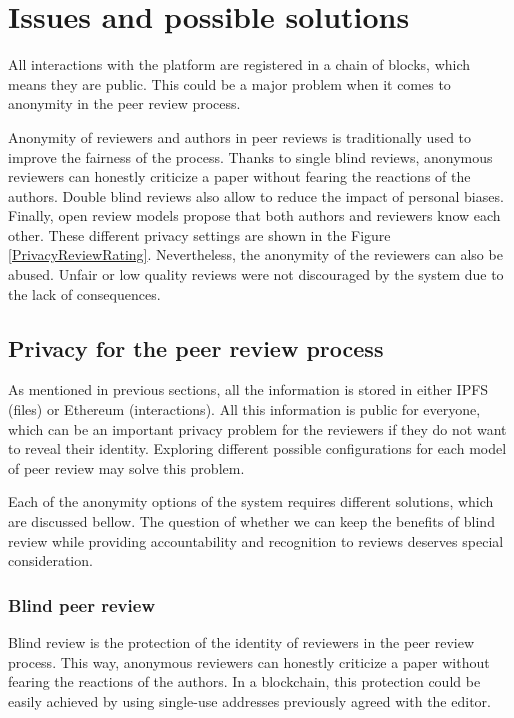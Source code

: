 \section{Issues and possible solutions}
\label{sec:privacyReview}


All interactions with the platform are registered in a chain of blocks, which
means they are public. This could be a major problem when it comes to anonymity
in the peer review process.

Anonymity of reviewers and authors in peer reviews is traditionally used to
improve the fairness of the process. Thanks to single blind reviews, anonymous
reviewers can honestly criticize a paper without fearing the reactions of the
authors. Double blind reviews also allow to reduce the impact of personal
biases. Finally, open review models propose that both authors and reviewers know
each other. These different privacy settings are shown in the Figure
\ref{PrivacyReviewRating}. Nevertheless, the anonymity of the reviewers can also
be abused. Unfair or low quality reviews were not discouraged by the system due
to the lack of consequences.

\subsection{Privacy for the peer review process}
\label{sec:privacy-peer-review}

As mentioned in previous sections, all the information is stored in either IPFS
(files) or Ethereum (interactions). All this information is public for everyone,
which can be an important privacy problem for the reviewers if they do not want
to reveal their identity. Exploring different possible configurations for each
model of peer review may solve this problem.

Each of the anonymity options of the system requires different solutions, which
are discussed bellow. The question of whether we can keep the benefits of blind
review while providing accountability and recognition to reviews deserves
special consideration.

\subsubsection*{Blind peer review}
Blind review is the protection of the identity of reviewers in the peer review
process. This way, anonymous reviewers can honestly criticize a paper without
fearing the reactions of the authors. In a blockchain, this protection could be
easily achieved by using single-use addresses previously agreed with the editor.

